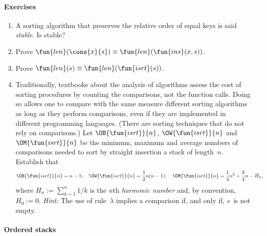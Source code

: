 \paragraph{Exercises}
\begin{enumerate}

  \item A sorting algorithm that preserves the relative order of equal
    keys is said \emph{stable}. Is
     stable?

  \item Prove \(\fun{len}(\cons{x}{s}) \equiv
    \fun{len}(\fun{ins}(x,s))\).

  \item Prove \(\fun{len}(s) \equiv \fun{len}(\fun{isrt}(s))\).

  \item Traditionally, textbooks about the analysis of algorithms
    assess the cost of sorting procedures by counting the comparisons,
    not the function calls. Doing so allows one to compare with the
    same measure different sorting algorithms as long as they perform
    comparisons, even if they are implemented in different programming
    languages. (There are sorting techniques that do not rely on
    comparisons.) Let
    \(\OB{\fun{isrt}}{n}\),
    \(\OW{\fun{isrt}}{n}\) and
    \(\OM{\fun{isrt}}{n}\) be the
    minimum, maximum and average numbers of comparisons needed to sort
    by straight insertion a stack of length~\(n\). Establish that
    \begin{equation*}
      \OB{\fun{isrt}}{n} = n - 1; \quad
      \OW{\fun{isrt}}{n} = \frac{1}{2}n(n - 1); \quad
      \OM{\fun{isrt}}{n} = \frac{1}{4}n^2 + \frac{3}{4}n - H_n,
    \end{equation*}
    where \(H_n := \sum_{k=1}^n{1/k}\) is the \(n\)th \emph{harmonic
      number} and, by convention, \(H_0 :=
    0\). \emph{Hint:} The use of rule~\(\lambda\) implies a comparison
    if, and only if, \(s\)~is not empty.

\end{enumerate}

\paragraph{Ordered stacks}

